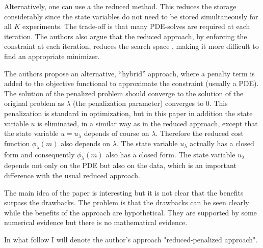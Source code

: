 \documentclass[12pt]{article}
\begin{document}
Alternatively, one can use a the reduced method. 
This reduces the storage considerably since the state variables do not need to be stored simultaneously for all $K$ experiments. 
The trade-off is that many PDE-solves are required at each iteration. 
The authors also argue that the reduced approach, by enforcing the constraint at each iteration, reduces the search space , making it more difficult to find an appropriate minimizer. 

The authors propose an alternative, ``hybrid'' approach, where a penalty term is added to the objective functional to approximate the constraint (usually a PDE). 
The solution of the penalized problem should converge to the solution of the original problem as $\lambda$ (the penalization parameter) converges to $0$. 
This penalization is standard in optimization, but in this paper in addition the state variable $u$ is eliminated, in a similar way as in the reduced approach, except that the state variable $u=u_\lambda$ depends of course on $\lambda$. Therefore the reduced cost function $\phi_\lambda(m)$ also depends on $\lambda$. The state variable $u_\lambda$ actually has a closed form and consequently $\phi_\lambda(m)$ also has a closed form. The state variable $u_\lambda$ depends not only on the PDE but also on the data, which is an important difference with the usual reduced approach. 

The main idea of the paper is interesting but it is not clear that the benefits surpass the drawbacks. The problem is that the drawbacks can be seen clearly while the benefits of the approach are hypothetical. They are supported by some numerical evidence but there is no mathematical evidence.

In what follow I will denote the author's approach "reduced-penalized approach". 
\end{document}
